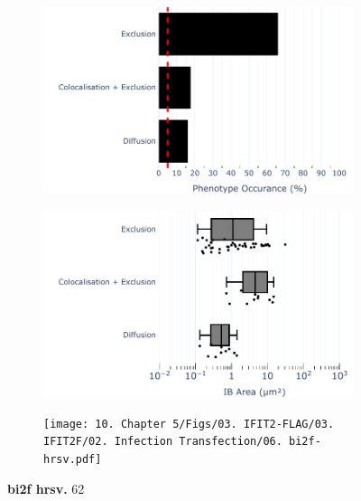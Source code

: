 \begin{figure}
    \begin{subfigure}{0.495\textwidth}
        \caption{}
        \includegraphics[width=1\linewidth]{10. Chapter 5/Figs/03. IFIT2-FLAG/03. IFIT2F/02. Infection Transfection/04. bar_bi2f_hrsv.pdf} 
    \end{subfigure}
    \begin{subfigure}{0.495\textwidth}
        \caption{}
        \includegraphics[width=1\linewidth]{10. Chapter 5/Figs/03. IFIT2-FLAG/03. IFIT2F/02. Infection Transfection/05. box_bi2f_hrsv.pdf}
    \end{subfigure}
    \begin{subfigure}{1\textwidth}
        \centering
        \caption{}
        \texttt{[image: 10. Chapter 5/Figs/03. IFIT2-FLAG/03. IFIT2F/02. Infection Transfection/06. bi2f-hrsv.pdf]}
    \end{subfigure}
    \caption[bi2f hrsv]{\textbf{bi2f hrsv.} 62}
    \label{fig:bi2f hrsv}
\end{figure}

